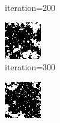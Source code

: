 \documentclass{article}
\begin{document}
\begin{figure}[h]
\begin{subfigure}[t]{0.18\textwidth}
\vspace{-0.6cm}
\caption{iteration=200}
\end{subfigure}\hspace{0.01\textwidth}
\begin{subfigure}[t]{0.18\textwidth}
\centering
\includegraphics[width=\textwidth]{./computational/results/gibbs_comb_sampler_negative_iter_300.png}
\vspace{-0.6cm}
\caption{iteration=300}
\end{subfigure}\hspace{0.01\textwidth}
\begin{subfigure}[t]{0.18\textwidth}
\centering
\includegraphics[width=\textwidth]{./computational/results/gibbs_comb_sampler_negative_iter_400.png}

\end{subfigure}
\end{figure}
\end{document}
